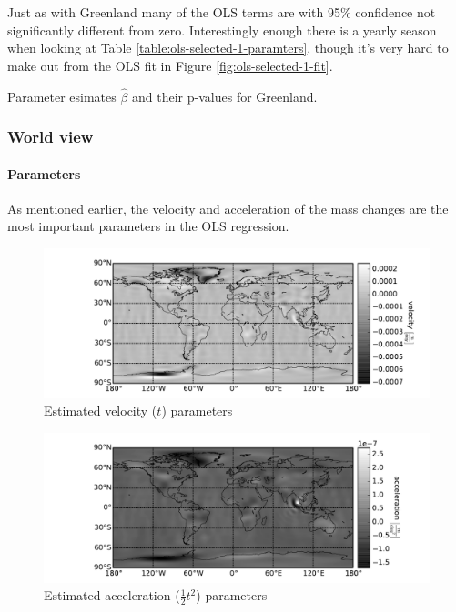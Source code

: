 Just as with Greenland many of the OLS terms are with 95\% confidence not significantly different from zero. Interestingly enough there is a yearly season when looking at Table \ref{table:ols-selected-1-paramters}, though it's very hard to make out from the OLS fit in Figure \ref{fig:ols-selected-1-fit}.

\begin{table}[H]
\centering
\centerline{}
\caption{Parameter esimates $\hat{\beta}$ and their p-values for Greenland. }
\label{table:ols-selected-1-paramters}
\end{table}

\pagebreak
\subsubsection{World view}

\paragraph{Parameters}

As mentioned earlier, the velocity and acceleration of the mass changes are the most important parameters in the OLS regression.
\begin{figure}[H]
	\centering
	\includegraphics[width=\textwidth]{figures/ols-world-parameter-vel}
	\caption{Estimated velocity ($t$) parameters}
	\label{fig:ols-world-parameter-vel}
\end{figure}

\begin{figure}[H]
	\centering
	\includegraphics[width=\textwidth]{figures/ols-world-parameter-acc}
	\caption{Estimated acceleration ($\frac{1}{2} t^2$) parameters}
	\label{fig:ols-world-parameter-acc}
\end{figure}

